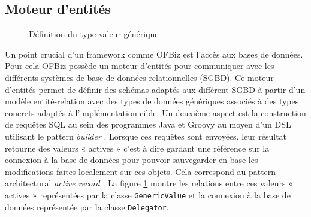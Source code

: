 \documentclass[a4paper, 11pt]{report}
\begin{document}
\subsection{Moteur d'entités}

\begin{figure}
  \centering
  \caption{Définition du type valeur générique}
  \label{fig:genericvalue}
\end{figure}

Un point crucial d'un framework comme OFBiz est l'accès aux bases de
données. Pour cela OFBiz possède un moteur d'entités pour communiquer
avec les différents systèmes de base de données relationnelles
(SGBD). Ce moteur d'entités permet de définir des schémas adaptés aux
différent SGBD à partir d'un modèle entité-relation avec des types de
données génériques associés à des types concrets adaptés à
l'implémentation cible. Un deuxième aspect est la construction de
requêtes SQL au sein des programmes Java et Groovy au moyen d'un DSL
utilisant le pattern \emph{builder} \cite{gamma1993design}. Lorsque
ces requêtes sont envoyées, leur résultat retourne des valeurs «
actives » c'est à dire gardant une référence sur la connexion à la
base de données pour pouvoir sauvegarder en base les modifications
faites localement sur ces objets. Cela correspond au pattern
architectural \emph{active record} \cite{fowler2002patterns}. La
figure \ref{fig:genericvalue} montre les relations entre ces valeurs «
actives » représentées par la classe \verb=GenericValue= et la
connexion à la base de données représentée par la classe
\verb=Delegator=.
\end{document}

